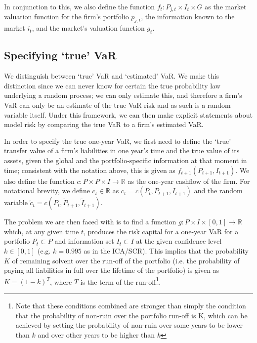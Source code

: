 In conjunction to this, we also define the function $f_t:P_{j,t}
\times I_t \times G$ as the market valuation function for the firm's portfolio
$p_{j,t}$, the information known to the market $i_{t}$, and the market's
valuation function $g_t$.

\subsection{Specifying `true' VaR}
We distinguish between `true' VaR and `estimated' VaR. We make this distinction
since we can never know for certain the true probability law underlying a
random process; we can only estimate this, and therefore a firm's VaR can only
be an estimate of the true VaR risk and as such is a random variable itself.
Under this framework, we can then make explicit statements about model risk by
comparing the true VaR to a firm's estimated VaR.

In order to specify the true one-year VaR, we first need to define the `true'
transfer value of a firm's liabilities in one year's time and the true value of
its assets, given the global and the portfolio-specific information at that
moment in time; consistent with the notation above, this is given as
$ f_{t+1} \left( P_{t+1}, I_{t+1} \right) $. We also define the function
$ c:P \times P \times I \rightarrow \mathbb{R} $ as the one-year cashflow of
the firm. For notational brevity, we define $ c_{t} \in \mathbb{R} $ as $ c_{t}
= c \left( P_{t}, P_{t+1}, I_{t+1} \right)$ and the random variable
$ \tilde{c}_{t} = c \left( P_{t}, \tilde{P}_{t+1}, \tilde{I}_{t+1} \right)$.

The problem we are then faced with is to find a function $ g:P \times I \times
\left[ 0,1 \right] \rightarrow \mathbb R $ which, at any given time $ t $,
produces the risk capital for a one-year VaR for a portfolio $ P_t \subset{P}
$ and information set $ I_t \subset{I} $ at the given confidence level
$ k \in{\left[ 0, 1 \right]} $ (e.g. $ k = 0.995 $ as in the ICA/SCR). This
implies that the probability $ K $ of remaining solvent over the run-off of the
portfolio (i.e. the probability of paying all liabilities in full over the
lifetime of the portfolio) is given as $ K = \left( 1 - k \right) ^ T $, where
$ T $ is the term of the run-off\footnote{Note that these conditions combined
are stronger than simply the condition that the probability of non-ruin over
the portfolio run-off is K, which can be achieved by setting the probability of
non-ruin over some years to be lower than $ k $ and over other years to be
higher than $ k $}.

